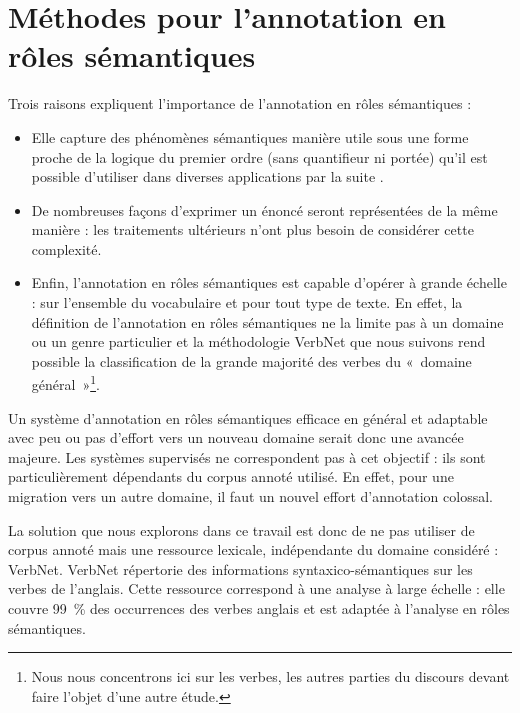 \documentclass[oneside,parskip,draft]{scrbook}
\begin{document}




\part{Méthodes pour l'annotation en rôles sémantiques}
\label{part:srl}

Trois raisons expliquent l'importance de l'annotation en rôles sémantiques :

\begin{itemize}

    \item Elle capture des phénomènes sémantiques manière utile sous une forme
        proche de la logique du premier ordre (sans quantifieur ni portée)
        qu'il est possible d'utiliser dans diverses applications par la suite
        \citep{osman2012improved,xie2013semantic}.

    \item De nombreuses façons d'exprimer un énoncé seront représentées de la
        même manière : les traitements ultérieurs n'ont plus besoin de
        considérer cette complexité.

    \item Enfin, l'annotation en rôles sémantiques est capable d'opérer à
        grande échelle : sur l'ensemble du vocabulaire et pour tout type de
        texte.  En effet, la définition de l'annotation en rôles sémantiques ne
        la limite pas à un domaine ou un genre particulier et la méthodologie
        VerbNet que nous suivons rend possible la classification de la grande
        majorité des verbes du «~domaine général~»\footnote{Nous nous
            concentrons ici sur les verbes, les autres parties du discours
        devant faire l'objet d'une autre étude.}.

\end{itemize}

Un système d'annotation en rôles sémantiques efficace en général et adaptable
avec peu ou pas d'effort vers un nouveau domaine serait donc une avancée
majeure. Les systèmes supervisés ne correspondent pas à cet objectif : ils sont
particulièrement dépendants du corpus annoté utilisé. En effet, pour une
migration vers un autre domaine, il faut un nouvel effort d'annotation
colossal.

La solution que nous explorons dans ce travail est donc de ne pas utiliser de
corpus annoté mais une ressource lexicale, indépendante du domaine considéré :
VerbNet. VerbNet répertorie des informations syntaxico-sémantiques sur les
verbes de l'anglais.  Cette ressource correspond à une analyse à large échelle
: elle couvre 99~\% des occurrences des verbes anglais \citep[partie 1,
p~.53]{palmer2013semantic} et est adaptée à l'analyse en rôles sémantiques.
\end{document}
